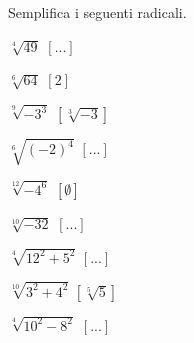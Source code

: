 
\begin{esercizio}[\Ast]
 \label{ese:2.24}
Semplifica i seguenti radicali.
\vspace{-.5em}
 \begin{multicols}{3}
 \begin{enumeratea}
 \item $\sqrt[4]{49}$
  \hfill $\left[...\right]$
 \item $\sqrt[6]{64}$
  \hfill $\left[2\right]$
 \item $\sqrt[9]{-3^3}$
  \hfill $\left[\sqrt[3]{-3}\right]$
 \item $\sqrt[6]{(-2)^4}$
  \hfill $\left[...\right]$
 \item $\sqrt[12]{-4^6}$
  \hfill $\left[\emptyset\right]$
 \item $\sqrt[10]{-32}$
  \hfill $\left[...\right]$
 \item $\sqrt[4]{12^2+5^2}$
  \hfill $\left[...\right]$
 \item $\sqrt[10]{3^2+4^2}$
  \hfill $\left[\sqrt[5]5\right]$
 \item $\sqrt[4]{10^2-8^2}$
  \hfill $\left[...\right]$

\end{enumeratea}
\end{multicols}
\end{esercizio}
